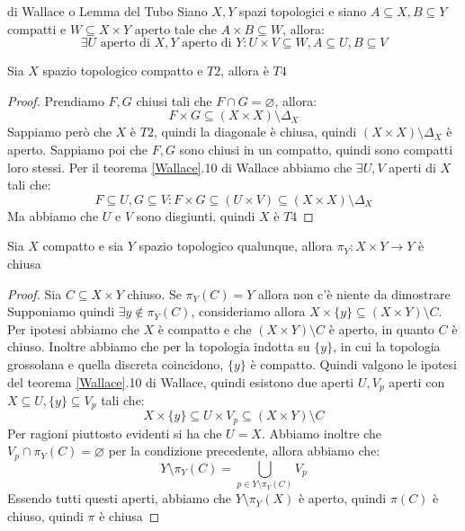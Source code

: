 \documentclass[11pt,a4paper,twoside]{article}
\theoremstyle{definition}
\begin{document}
\begin{thm}{di Wallace o Lemma del Tubo}{}\label{Wallace}
	Siano $X, Y$ spazi topologici e siano $A \subseteq X, B \subseteq Y$ compatti e $W \subseteq X \times Y$ aperto tale che $A \times B \subseteq W$, allora:
	\[ \exists U \text{ aperto di }X, Y \text{ aperto di }Y : U \times V \subseteq W, A \subseteq U, B \subseteq V \]
\end{thm}

\begin{cor}{}{}
	Sia $X$ spazio topologico compatto e $T2$, allora è $T4$
\end{cor}

\begin{proof}
	Prendiamo $F, G$ chiusi tali che $F\cap G = \varnothing$, allora:
	\[ F \times G \subseteq (X \times X)\setminus \Delta_X \]
	Sappiamo però che $X$ è $T2$, quindi la diagonale è chiusa, quindi $(X \times X)\setminus \Delta_X$ è aperto. Sappiamo poi che $F, G$ sono chiusi in un compatto, quindi sono compatti loro stessi. Per il teorema \ref{Wallace}.10 di Wallace abbiamo che $\exists U,V$ aperti di $X$ tali che:
	\[ F \subseteq U, G \subseteq V : F \times G \subseteq (U \times V)\subseteq (X \times X )\setminus \Delta_X \]
	Ma abbiamo che $U$ e $V$ sono disgiunti, quindi $X$ è $T4$
\end{proof}

\begin{cor}{}{}
	Sia $X$ compatto e sia $Y$ spazio topologico qualunque, allora $\pi_Y: X \times Y \to Y$ è chiusa
\end{cor}

\begin{proof}
	Sia $C \subseteq X \times Y$ chiuso. Se $\pi_Y(C)=Y$ allora non c'è niente da dimostrare\\
	Supponiamo quindi $\exists y \not \in \pi_Y(C)$, consideriamo allora $X \times \{y\} \subseteq (X \times Y)\setminus C$. Per ipotesi abbiamo che $X$ è compatto e che $(X \times Y)\setminus C$ è aperto, in quanto $C$ è chiuso. Inoltre abbiamo che per la topologia indotta su $\{y\}$, in cui la topologia grossolana e quella discreta coincidono, $\{y\}$ è compatto. Quindi valgono le ipotesi del teorema \ref{Wallace}.10 di Wallace, quindi esistono due aperti $U, V_p$ aperti con $X \subseteq U, \{y\}\subseteq V_p$ tali che:
	\[ X \times \{y\} \subseteq U \times V_p \subseteq (X \times Y)\setminus C \]
	Per ragioni piuttosto evidenti si ha che $U=X$. Abbiamo inoltre che $V_p \cap \pi_Y(C) = \varnothing$ per la condizione precedente, allora abbiamo che:
	\[ Y\setminus \pi_Y(C) = \bigcup_{p \in Y \setminus \pi_Y(C)} V_p \]
	Essendo tutti questi aperti, abbiamo che $Y \setminus \pi_Y(X)$ è aperto, quindi $\pi(C)$ è chiuso, quindi $\pi$ è chiusa
\end{proof}
\end{document}
